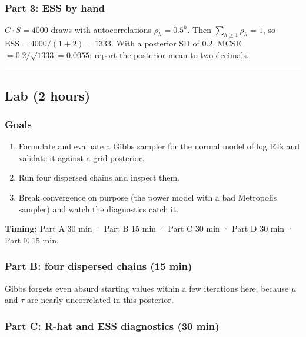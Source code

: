 \subsubsection{Part 3: ESS by hand}

\(C \cdot S = 4000\) draws with autocorrelations \(\rho_h = 0.5^h\).
Then \(\sum_{h\ge1}\rho_h = 1\), so
\(\mathrm{ESS} = 4000/(1 + 2) = 1333\). With a posterior SD of 0.2, MCSE
\(= 0.2/\sqrt{1333} = 0.0055\): report the posterior mean to two
decimals.

\begin{center}\rule{0.5\linewidth}{0.5pt}\end{center}


\subsection{Lab (2 hours)}

\subsubsection{Goals}

\begin{enumerate}
\def\labelenumi{\arabic{enumi}.}
\tightlist
\item
  Formulate and evaluate a Gibbs sampler for the normal model of log RTs and validate
  it against a grid posterior.
\item
  Run four dispersed chains and inspect them.
\item
  Break convergence on purpose (the power model with a bad Metropolis
  sampler) and watch the diagnostics catch it.
\end{enumerate}

\textbf{Timing:} Part A 30 min · Part B 15 min · Part C 30 min · Part D
30 min · Part E 15 min.

\subsubsection{Part B: four dispersed chains (15 min)}

Gibbs forgets even absurd starting values within a few iterations here,
because \(\mu\) and \(\tau\) are nearly uncorrelated in this posterior.

\subsubsection{Part C: R-hat and ESS diagnostics (30 min)}

